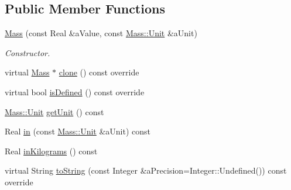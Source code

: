 \subsection*{Public Member Functions}
\begin{DoxyCompactItemize}
\item 
\hyperlink{classostk_1_1physics_1_1units_1_1_mass_a85999250131435a6d4116c826e93bfef}{Mass} (const Real \&a\+Value, const \hyperlink{classostk_1_1physics_1_1units_1_1_mass_aa8994892478fdbe6dc78d4bca08db0fa}{Mass\+::\+Unit} \&a\+Unit)
\begin{DoxyCompactList}\small\item\em Constructor. \end{DoxyCompactList}\item 
virtual \hyperlink{classostk_1_1physics_1_1units_1_1_mass}{Mass} $\ast$ \hyperlink{classostk_1_1physics_1_1units_1_1_mass_a1466c0c4860d94b0e6630476d4216033}{clone} () const override
\item 
virtual bool \hyperlink{classostk_1_1physics_1_1units_1_1_mass_ad6bb821365eff3a414d9fd07a7730d99}{is\+Defined} () const override
\item 
\hyperlink{classostk_1_1physics_1_1units_1_1_mass_aa8994892478fdbe6dc78d4bca08db0fa}{Mass\+::\+Unit} \hyperlink{classostk_1_1physics_1_1units_1_1_mass_a6ac920e7e64b09c39693a0837c070885}{get\+Unit} () const
\item 
Real \hyperlink{classostk_1_1physics_1_1units_1_1_mass_a4e337ca71db395510a6f6763bc356e9a}{in} (const \hyperlink{classostk_1_1physics_1_1units_1_1_mass_aa8994892478fdbe6dc78d4bca08db0fa}{Mass\+::\+Unit} \&a\+Unit) const
\item 
Real \hyperlink{classostk_1_1physics_1_1units_1_1_mass_a21d19ce58f97d3c96c95ccbdcaf7b216}{in\+Kilograms} () const
\item 
virtual String \hyperlink{classostk_1_1physics_1_1units_1_1_mass_aa8993fb7d2dbed494bbb68f8ec002af5}{to\+String} (const Integer \&a\+Precision=Integer\+::\+Undefined()) const override
\end{DoxyCompactItemize}
